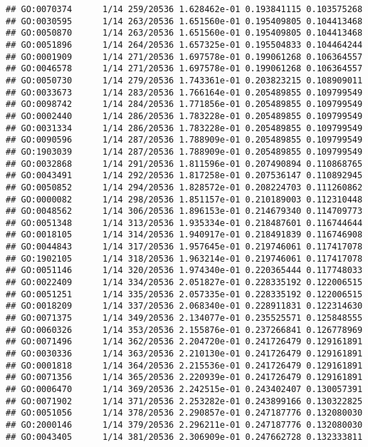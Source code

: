 \documentclass[
]{article}
\begin{document}
\begin{verbatim}
## GO:0070374      1/14 259/20536 1.628462e-01 0.193841115 0.103575268
## GO:0030595      1/14 263/20536 1.651560e-01 0.195409805 0.104413468
## GO:0050870      1/14 263/20536 1.651560e-01 0.195409805 0.104413468
## GO:0051896      1/14 264/20536 1.657325e-01 0.195504833 0.104464244
## GO:0001909      1/14 271/20536 1.697578e-01 0.199061268 0.106364557
## GO:0046578      1/14 271/20536 1.697578e-01 0.199061268 0.106364557
## GO:0050730      1/14 279/20536 1.743361e-01 0.203823215 0.108909011
## GO:0033673      1/14 283/20536 1.766164e-01 0.205489855 0.109799549
## GO:0098742      1/14 284/20536 1.771856e-01 0.205489855 0.109799549
## GO:0002440      1/14 286/20536 1.783228e-01 0.205489855 0.109799549
## GO:0031334      1/14 286/20536 1.783228e-01 0.205489855 0.109799549
## GO:0090596      1/14 287/20536 1.788909e-01 0.205489855 0.109799549
## GO:1903039      1/14 287/20536 1.788909e-01 0.205489855 0.109799549
## GO:0032868      1/14 291/20536 1.811596e-01 0.207490894 0.110868765
## GO:0043491      1/14 292/20536 1.817258e-01 0.207536147 0.110892945
## GO:0050852      1/14 294/20536 1.828572e-01 0.208224703 0.111260862
## GO:0000082      1/14 298/20536 1.851157e-01 0.210189003 0.112310448
## GO:0048562      1/14 306/20536 1.896153e-01 0.214679340 0.114709773
## GO:0051348      1/14 313/20536 1.935334e-01 0.218487601 0.116744644
## GO:0018105      1/14 314/20536 1.940917e-01 0.218491839 0.116746908
## GO:0044843      1/14 317/20536 1.957645e-01 0.219746061 0.117417078
## GO:1902105      1/14 318/20536 1.963214e-01 0.219746061 0.117417078
## GO:0051146      1/14 320/20536 1.974340e-01 0.220365444 0.117748033
## GO:0022409      1/14 334/20536 2.051827e-01 0.228335192 0.122006515
## GO:0051251      1/14 335/20536 2.057335e-01 0.228335192 0.122006515
## GO:0018209      1/14 337/20536 2.068340e-01 0.228911831 0.122314630
## GO:0071375      1/14 349/20536 2.134077e-01 0.235525571 0.125848555
## GO:0060326      1/14 353/20536 2.155876e-01 0.237266841 0.126778969
## GO:0071496      1/14 362/20536 2.204720e-01 0.241726479 0.129161891
## GO:0030336      1/14 363/20536 2.210130e-01 0.241726479 0.129161891
## GO:0001818      1/14 364/20536 2.215536e-01 0.241726479 0.129161891
## GO:0071356      1/14 365/20536 2.220939e-01 0.241726479 0.129161891
## GO:0006470      1/14 369/20536 2.242515e-01 0.243402407 0.130057391
## GO:0071902      1/14 371/20536 2.253282e-01 0.243899166 0.130322825
## GO:0051056      1/14 378/20536 2.290857e-01 0.247187776 0.132080030
## GO:2000146      1/14 379/20536 2.296211e-01 0.247187776 0.132080030
## GO:0043405      1/14 381/20536 2.306909e-01 0.247662728 0.132333811

\end{verbatim}
\end{document}
